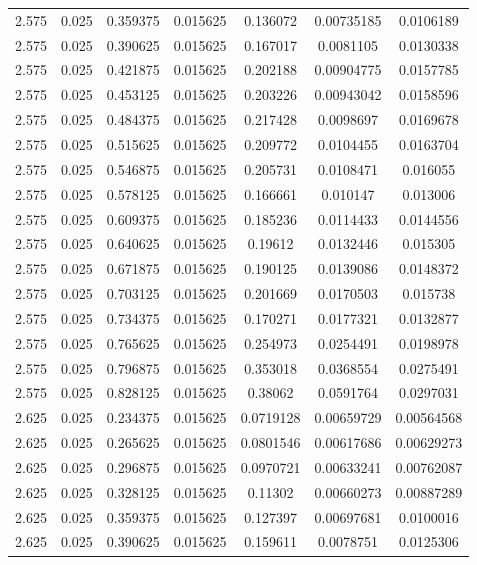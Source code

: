 \begin{table}[bh]
\begin{center}
{\begin{tabular}{ccccccc}
2.575	 & 0.025 & 	0.359375	 & 0.015625	 & 0.136072	 & 0.00735185	 & 0.0106189 \\ 
2.575	 & 0.025 & 	0.390625	 & 0.015625	 & 0.167017	 & 0.0081105	 & 0.0130338 \\ 
2.575	 & 0.025 & 	0.421875	 & 0.015625	 & 0.202188	 & 0.00904775	 & 0.0157785 \\ 
2.575	 & 0.025 & 	0.453125	 & 0.015625	 & 0.203226	 & 0.00943042	 & 0.0158596 \\ 
2.575	 & 0.025 & 	0.484375	 & 0.015625	 & 0.217428	 & 0.0098697	 & 0.0169678 \\ 
2.575	 & 0.025 & 	0.515625	 & 0.015625	 & 0.209772	 & 0.0104455	 & 0.0163704 \\ 
2.575	 & 0.025 & 	0.546875	 & 0.015625	 & 0.205731	 & 0.0108471	 & 0.016055 \\ 
2.575	 & 0.025 & 	0.578125	 & 0.015625	 & 0.166661	 & 0.010147	 & 0.013006 \\ 
2.575	 & 0.025 & 	0.609375	 & 0.015625	 & 0.185236	 & 0.0114433	 & 0.0144556 \\ 
2.575	 & 0.025 & 	0.640625	 & 0.015625	 & 0.19612	 & 0.0132446	 & 0.015305 \\ 
2.575	 & 0.025 & 	0.671875	 & 0.015625	 & 0.190125	 & 0.0139086	 & 0.0148372 \\ 
2.575	 & 0.025 & 	0.703125	 & 0.015625	 & 0.201669	 & 0.0170503	 & 0.015738 \\ 
2.575	 & 0.025 & 	0.734375	 & 0.015625	 & 0.170271	 & 0.0177321	 & 0.0132877 \\ 
2.575	 & 0.025 & 	0.765625	 & 0.015625	 & 0.254973	 & 0.0254491	 & 0.0198978 \\ 
2.575	 & 0.025 & 	0.796875	 & 0.015625	 & 0.353018	 & 0.0368554	 & 0.0275491 \\ 
2.575	 & 0.025 & 	0.828125	 & 0.015625	 & 0.38062	 & 0.0591764	 & 0.0297031 \\ 
2.625	 & 0.025 & 	0.234375	 & 0.015625	 & 0.0719128	 & 0.00659729	 & 0.00564568 \\ 
2.625	 & 0.025 & 	0.265625	 & 0.015625	 & 0.0801546	 & 0.00617686	 & 0.00629273 \\ 
2.625	 & 0.025 & 	0.296875	 & 0.015625	 & 0.0970721	 & 0.00633241	 & 0.00762087 \\ 
2.625	 & 0.025 & 	0.328125	 & 0.015625	 & 0.11302	 & 0.00660273	 & 0.00887289 \\ 
2.625	 & 0.025 & 	0.359375	 & 0.015625	 & 0.127397	 & 0.00697681	 & 0.0100016 \\ 
2.625	 & 0.025 & 	0.390625	 & 0.015625	 & 0.159611	 & 0.0078751	 & 0.0125306 \\ 

\end{tabular}}
\end{center}
\end{table}
